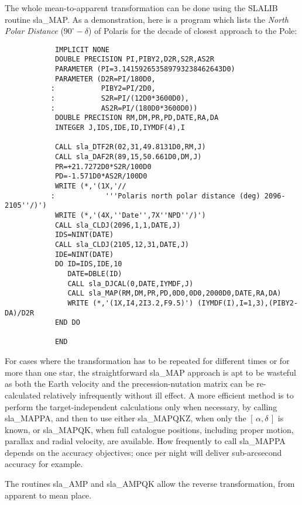 \documentclass[11pt,twoside]{article}
\newcommand{\radec}     {$[\,\alpha,\delta\,]$}
\begin{document}
The whole mean-to-apparent transformation can be done using the SLALIB
routine
sla\_MAP.  As a demonstration, here is a program which lists the
{\it North Polar Distance}\/ ($90^\circ-\delta$) of Polaris for
the decade of closest approach to the Pole:
\goodbreak
\begin{verbatim}
            IMPLICIT NONE
            DOUBLE PRECISION PI,PIBY2,D2R,S2R,AS2R
            PARAMETER (PI=3.141592653589793238462643D0)
            PARAMETER (D2R=PI/180D0,
           :           PIBY2=PI/2D0,
           :           S2R=PI/(12D0*3600D0),
           :           AS2R=PI/(180D0*3600D0))
            DOUBLE PRECISION RM,DM,PR,PD,DATE,RA,DA
            INTEGER J,IDS,IDE,ID,IYMDF(4),I

            CALL sla_DTF2R(02,31,49.8131D0,RM,J)
            CALL sla_DAF2R(89,15,50.661D0,DM,J)
            PR=+21.7272D0*S2R/100D0
            PD=-1.571D0*AS2R/100D0
            WRITE (*,'(1X,'//
           :            '''Polaris north polar distance (deg) 2096-2105''/)')
            WRITE (*,'(4X,''Date'',7X''NPD''/)')
            CALL sla_CLDJ(2096,1,1,DATE,J)
            IDS=NINT(DATE)
            CALL sla_CLDJ(2105,12,31,DATE,J)
            IDE=NINT(DATE)
            DO ID=IDS,IDE,10
               DATE=DBLE(ID)
               CALL sla_DJCAL(0,DATE,IYMDF,J)
               CALL sla_MAP(RM,DM,PR,PD,0D0,0D0,2000D0,DATE,RA,DA)
               WRITE (*,'(1X,I4,2I3.2,F9.5)') (IYMDF(I),I=1,3),(PIBY2-DA)/D2R
            END DO

            END
\end{verbatim}
\goodbreak
For cases where the transformation has to be repeated for different
times or for more than one star, the straightforward
sla\_MAP
approach is apt to be
wasteful as both the Earth velocity and the
precession-nutation matrix can be re-calculated relatively
infrequently without ill effect.  A more efficient method is to
perform the target-independent calculations only when necessary,
by calling
sla\_MAPPA,
and then to use either
sla\_MAPQKZ,
when only the \radec\/ is known, or
sla\_MAPQK,
when full catalogue positions, including proper motion, parallax and
radial velocity, are available.  How frequently to call
sla\_MAPPA
depends on the accuracy objectives;  once per
night will deliver sub-arcsecond accuracy for example.

The routines
sla\_AMP
and
sla\_AMPQK
allow the reverse transformation, from apparent to mean place.
\end{document}

